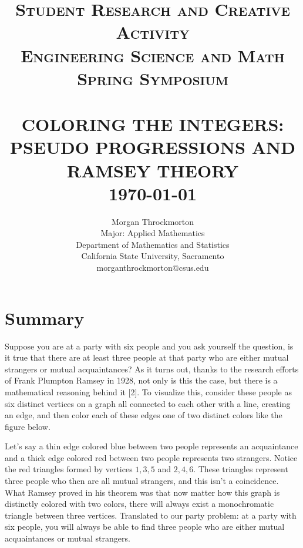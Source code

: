 \documentclass[ fontsize=10pt,twoside]{scrartcl}
\title{	\Large \textsc{ Student Research and Creative Activity \\
Engineering Science and Math \\
Spring Symposium} 	
		 	\\[2.0cm]	
			\HRule{2pt} \\						
			\LARGE \textbf{\uppercase{Coloring the Integers: Pseudo Progressions and Ramsey Theory}}	
			\HRule{2pt} \\ [2cm]	
			\Large \today			
		}
\author{
		Morgan Throckmorton\\
		Major: Applied Mathematics\\
		Department of Mathematics and Statistics\\	
		California State University, Sacramento\\
        morganthrockmorton@csus.edu \\
}
\makeatletter
\def\printtitle{%
    {\centering \@title\par}}
\def\printauthor{					
    {\centering \Large \@author}}
\makeatother
\begin{document}
\thispagestyle{empty}

\printtitle	
  	\vfill
\printauthor	
\newpage

\section{Summary}
\doublespacing 
Suppose you are at a party with six people and you ask yourself the question, is it true that there are at least three people at that party who are either mutual strangers or mutual acquaintances? As it turns out, thanks to the research efforts of Frank Plumpton Ramsey in 1928, not only is this the case, but there is a mathematical reasoning behind it [2]. To visualize this, consider these people as six distinct vertices on a graph all connected to each other with a line, creating an edge, and then color each of these edges one of two distinct colors like the figure below.
\begin{center}

\end{center}

Let's say a thin edge colored blue between two people represents an acquaintance and a thick edge colored red between two people represents two strangers. Notice the red triangles formed by vertices $1,3,5$ and $2,4,6$. These triangles represent three people who then are all mutual strangers, and this isn't a coincidence. What Ramsey proved in his theorem was that now matter how this graph is distinctly colored with two colors, there will always exist a monochromatic triangle between three vertices. Translated to our party problem: at a party with six people, you will always be able to find three people who are either mutual acquaintances or mutual strangers.
\end{document}
